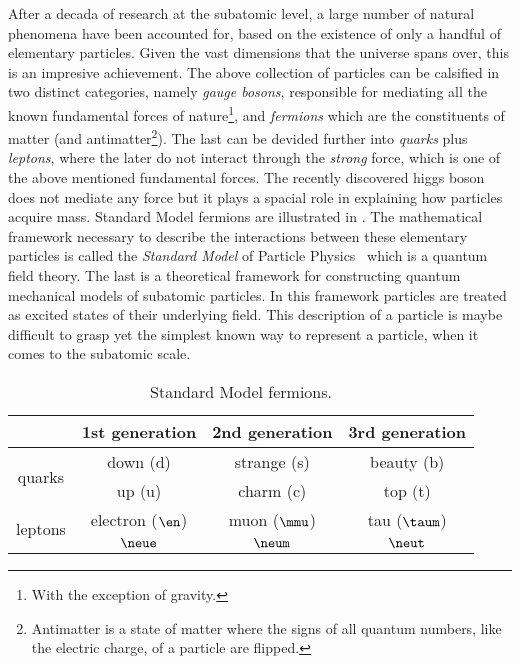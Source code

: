 After a decada of research at the subatomic level, a large number of natural phenomena have been accounted
for, based on the existence of only a handful of elementary particles. Given the vast dimensions that the
universe spans over, this is an impresive achievement. The above collection of particles can be calsified
in two distinct categories, namely {\it gauge bosons}, responsible for mediating all the known fundamental
forces of nature\footnote{With the exception of gravity.}, and {\it fermions} which are the constituents
of matter
(and antimatter\footnote{Antimatter is a state of matter where the signs of all quantum numbers, like the electric charge, of a particle are flipped.}).
The last can be devided further into {\it quarks} plus {\it leptons}, where the later do not interact through
the {\it strong} force, which is one of the above mentioned fundamental forces. The recently discovered higgs
boson~\cite{higgs-cms,higgs-atlas} does not mediate any force but it plays a spacial role in explaining how
particles acquire mass. Standard Model fermions are illustrated in .
The mathematical framework necessary to describe the interactions between these elementary particles is called
the \textit{Standard Model} of Particle Physics~\cite{sm-glashow,sm-weinberg,sm-salam} which is a quantum field theory.
The last is a theoretical framework for constructing quantum mechanical models of subatomic particles.
In this framework particles are treated as excited states of their underlying field. This description of a
particle is maybe difficult to grasp yet the simplest known way to represent a particle, when it comes to the subatomic scale.


\begin{table}[h!]
  \centering
 \begin{tabular}{cccc}
   \hline
                            &  1st generation         &  2nd generation    &  3rd generation    \\
   \hline
   \multirow{2}{*}{quarks}  & down (d)               &  strange (s)       &  beauty (b)        \\
                            &  up (u)                 &  charm (c)         &  top (t)           \\
   \hline
   \multirow{2}{*}{leptons} &    electron ($\en$)       &  muon ($\mmu$)     &  tau ($\taum$)     \\
                            &   $\neue$                &  $\neum$           &  $\neut$           \\
   \hline
 \end{tabular}
 \caption{Standard Model fermions.}
 \label{quarksLeptons}
\end{table}

